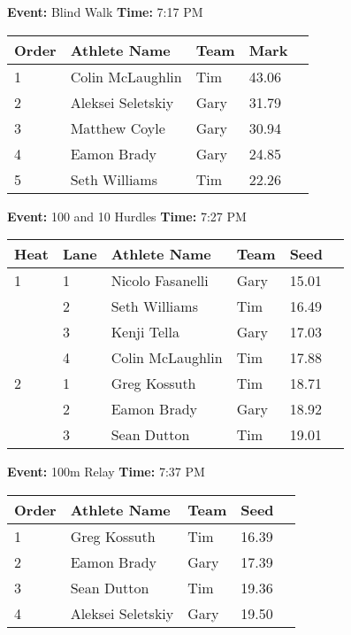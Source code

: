 \documentclass[10pt]{article}
\begin{document}
\textbf{Event:} Blind Walk \quad \textbf{Time:} 7:17 PM 

\vspace{1em}
\begin{tabular}{@{}lllll@{}}
\toprule

\textbf{Order} & \textbf{Athlete Name} & \textbf{Team} & \textbf{Mark} \\
\midrule
1 & Colin McLaughlin & Tim & 43.06 &\\
2 & Aleksei Seletskiy & Gary & 31.79 &\\
3 & Matthew Coyle & Gary & 30.94 &\\
4 & Eamon Brady & Gary & 24.85 &\\
5 & Seth Williams & Tim & 22.26 &\\
\bottomrule
\end{tabular}
\vspace{2.5em}


\textbf{Event:} 100 and 10 Hurdles \quad \textbf{Time:} 7:27 PM 

\vspace{1em}
\begin{tabular}{@{}llllll@{}}
\toprule
\textbf{{Heat}} &
\textbf{Lane} & \textbf{Athlete Name} & \textbf{Team} & \textbf{Seed} \\
\midrule
1 & 1 & Nicolo Fasanelli & Gary & 15.01 &\\
 & 2 & Seth Williams & Tim & 16.49 &\\
 & 3 & Kenji Tella & Gary & 17.03 &\\
 & 4 & Colin McLaughlin & Tim & 17.88 &\\
2 & 1 & Greg Kossuth & Tim & 18.71 &\\
 & 2 & Eamon Brady & Gary & 18.92 &\\
 & 3 & Sean Dutton & Tim & 19.01 &\\
\bottomrule
\end{tabular}
\vspace{2.5em}


\textbf{Event:} 100m Relay \quad \textbf{Time:} 7:37 PM 

\vspace{1em}
\begin{tabular}{@{}lllll@{}}
\toprule

\textbf{Order} & \textbf{Athlete Name} & \textbf{Team} & \textbf{Seed} \\
\midrule
1 & Greg Kossuth & Tim & 16.39 &\\
2 & Eamon Brady & Gary & 17.39 &\\
3 & Sean Dutton & Tim & 19.36 &\\
4 & Aleksei Seletskiy & Gary & 19.50 &\\
\bottomrule
\end{tabular}
\vspace{2.5em}
\end{document}
